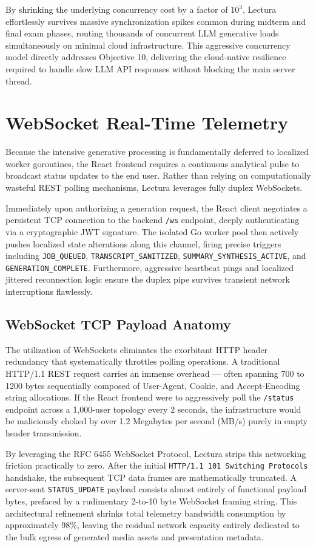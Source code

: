 By shrinking the underlying concurrency cost by a factor of $10^3$, Lectura effortlessly survives massive synchronization spikes common during midterm and final exam phases, routing thousands of concurrent LLM generative loads simultaneously on minimal cloud infrastructure. This aggressive concurrency model directly addresses Objective 10, delivering the cloud-native resilience required to handle slow LLM API responses without blocking the main server thread.

\section{WebSocket Real-Time Telemetry}
Because the intensive generative processing is fundamentally deferred to localized worker goroutines, the React frontend requires a continuous analytical pulse to broadcast status updates to the end user. Rather than relying on computationally wasteful REST polling mechanisms, Lectura leverages fully duplex WebSockets.

Immediately upon authorizing a generation request, the React client negotiates a persistent TCP connection to the backend \texttt{/ws} endpoint, deeply authenticating via a cryptographic JWT signature. The isolated Go worker pool then actively pushes localized state alterations along this channel, firing precise triggers including \texttt{JOB\_QUEUED}, \texttt{TRANSCRIPT\_SANITIZED}, \texttt{SUMMARY\_SYNTHESIS\_ACTIVE}, and \texttt{GENERATION\_COMPLETE}. Furthermore, aggressive heartbeat pings and localized jittered reconnection logic ensure the duplex pipe survives transient network interruptions flawlessly.

\subsection{WebSocket TCP Payload Anatomy}
The utilization of WebSockets eliminates the exorbitant HTTP header redundancy that systematically throttles polling operations. A traditional HTTP/1.1 REST request carries an immense overhead — often spanning 700 to 1200 bytes sequentially composed of User-Agent, Cookie, and Accept-Encoding string allocations. If the React frontend were to aggressively poll the \texttt{/status} endpoint across a 1,000-user topology every 2 seconds, the infrastructure would be maliciously choked by over 1.2 Megabytes per second (MB/s) purely in empty header transmission.

By leveraging the RFC 6455 WebSocket Protocol, Lectura strips this networking friction practically to zero. After the initial \texttt{HTTP/1.1 101 Switching Protocols} handshake, the subsequent TCP data frames are mathematically truncated. A server-sent \texttt{STATUS\_UPDATE} payload consists almost entirely of functional payload bytes, prefaced by a rudimentary 2-to-10 byte WebSocket framing string. This architectural refinement shrinks total telemetry bandwidth consumption by approximately 98\%, leaving the residual network capacity entirely dedicated to the bulk egress of generated media assets and presentation metadata.

